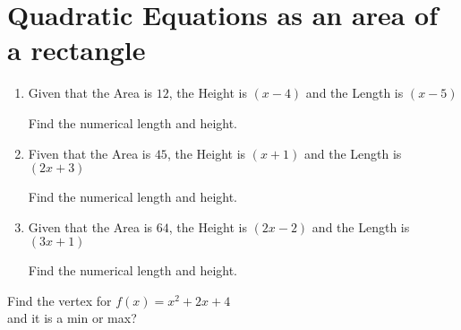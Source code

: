 \documentclass[12pt]{article}
\begin{document}
\noindent
\section*{Quadratic Equations as an area of a rectangle}


\begin{minipage}[t]{0.45\textwidth}
    \vspace{-2cm}
    \begin{enumerate}[label=\#\arabic*]
        \setcounter{enumi}{0} %
        \item Given that the Area is $12$, the Height is $(x-4)$ and the Length is $(x-5)$
        \\\par
        Find the numerical length and height. \\
        
        \vspace{5cm}
        \item Fiven that the Area is $45$, the Height is $(x+1)$ and the Length is $(2x+3)$
        \\\par
        Find the numerical length and height. \\

        \vspace{5cm}
        \item Given that the Area is $64$, the Height is $(2x-2)$ and the Length is $(3x+1)$
        \\\par
        Find the numerical length and height. \\
        \vspace{5cm}
    \end{enumerate}
\end{minipage}%
\hspace{1cm}
\begin{minipage}[t]{0.45\textwidth}

\vspace{5cm}

\vspace{5cm}

\end{minipage}

\noindent
Find the vertex for $f(x)=x^2+2x+4$ \\
and it is a min or max?
\end{document}
